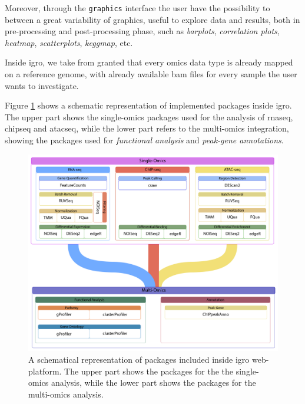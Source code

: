 Moreover, through the \lstinline!graphics! interface the user have the possibility to between a great variability of graphics, useful to explore data and results, both in pre-processing and post-processing phase, such as \textit{barplots}, \textit{correlation plots}, \textit{heatmap}, \textit{scatterplots}, \textit{keggmap}, etc.

Inside \gls{igro}, we take from granted that every omics data type is already mapped on a reference genome, with already available \gls{bam} files for every sample the user wants to investigate.

Figure \ref{fig:integrhopackscheme} shows a schematic representation of implemented packages inside \gls{igro}.
The upper part shows the single-omics packages used for the analysis of \gls{rnaseq}, \gls{chipseq} and \gls{atacseq}, while the lower part refers to the multi-omics integration, showing the packages used for \textit{functional analysis} and \textit{peak-gene annotations}.

\begin{figure}[h]
\centering
\includegraphics[width=\textwidth, keepaspectratio]{img/integrho/integrho_pack_scheme.pdf}
\caption[\gls{igro} packages scheme]{A schematical representation of packages included inside \gls{igro} web-platform.
The upper part shows the packages for the the single-omics analysis, while the lower part shows the packages for the multi-omics analysis.}
\label{fig:integrhopackscheme}
\end{figure}


